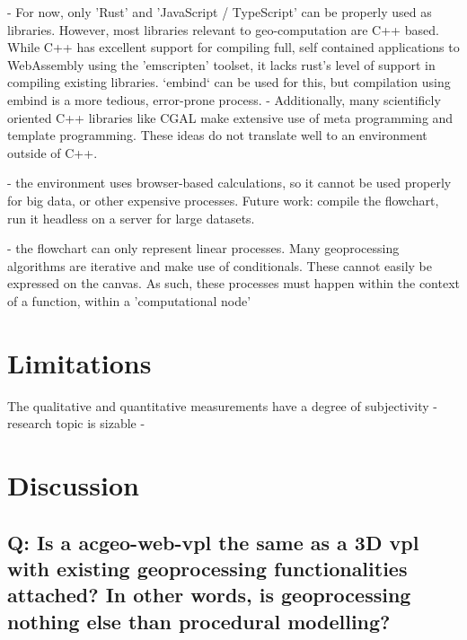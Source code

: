 \begin{note}
 - For now, only 'Rust' and 'JavaScript / TypeScript' can be properly used as libraries. However, most libraries relevant to geo-computation are C++ based. While C++ has excellent support for compiling full, self contained applications to WebAssembly using the 'emscripten' toolset, it lacks rust's level of support in compiling existing libraries. `embind` can be used for this, but compilation using embind is a more tedious, error-prone process.   
   - Additionally, many scientificly oriented C++ libraries like CGAL make extensive use of meta programming and template programming. These ideas do not translate well to an environment outside of C++. 

 - the environment uses browser-based calculations, so it cannot be used properly for big data, or other expensive processes.
   Future work: compile the flowchart, run it headless on a server for large datasets.
 
 - the flowchart can only represent linear processes. Many geoprocessing algorithms are iterative and make use of conditionals. These cannot easily be expressed on the canvas. As such, these processes must happen within the context of a function, within a 'computational node'

\end{note}

\section{Limitations}

The qualitative and quantitative measurements have a degree of subjectivity
- research topic is sizable
- 





\section{Discussion}
\label{sec:discussion}


\subsection{Q: Is a ac{geo-web-vpl} the same as a 3D vpl with existing geoprocessing functionalities attached? In other words, is geoprocessing nothing else than procedural modelling?}

